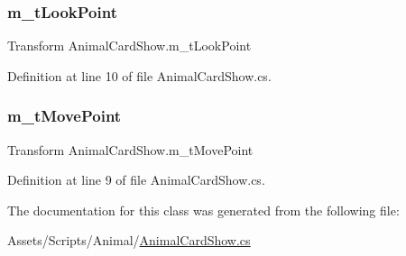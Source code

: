 \subsubsection{\texorpdfstring{m\+\_\+t\+Look\+Point}{m\_tLookPoint}}
{\footnotesize\ttfamily Transform Animal\+Card\+Show.\+m\+\_\+t\+Look\+Point}



Definition at line 10 of file Animal\+Card\+Show.\+cs.

\mbox{\label{class_animal_card_show_a94fa99e09d57e3ba12a2ee65ade137e0}} 
\subsubsection{\texorpdfstring{m\+\_\+t\+Move\+Point}{m\_tMovePoint}}
{\footnotesize\ttfamily Transform Animal\+Card\+Show.\+m\+\_\+t\+Move\+Point}



Definition at line 9 of file Animal\+Card\+Show.\+cs.



The documentation for this class was generated from the following file\+:\begin{DoxyCompactItemize}
\item 
Assets/\+Scripts/\+Animal/\mbox{\hyperlink{_animal_card_show_8cs}{Animal\+Card\+Show.\+cs}}\end{DoxyCompactItemize}
